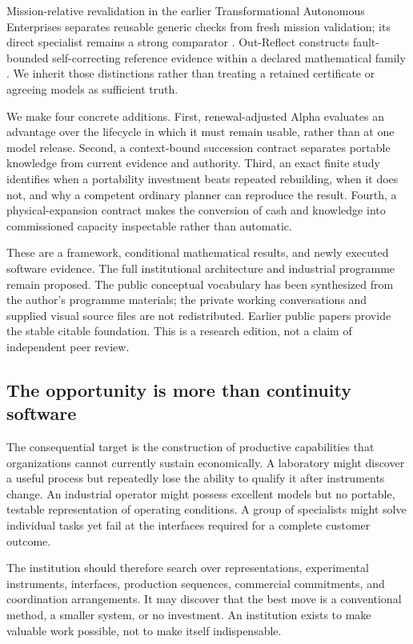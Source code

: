 Mission-relative revalidation in the earlier Transformational Autonomous Enterprises separates reusable generic checks from fresh mission validation; its direct specialist remains a strong comparator \citep{boucherEnterprise}. Out-Reflect constructs fault-bounded self-correcting reference evidence within a declared mathematical family \citep{boucherReflect}. We inherit those distinctions rather than treating a retained certificate or agreeing models as sufficient truth.

We make four concrete additions. First, renewal-adjusted Alpha evaluates an advantage over the lifecycle in which it must remain usable, rather than at one model release. Second, a context-bound succession contract separates portable knowledge from current evidence and authority. Third, an exact finite study identifies when a portability investment beats repeated rebuilding, when it does not, and why a competent ordinary planner can reproduce the result. Fourth, a physical-expansion contract makes the conversion of cash and knowledge into commissioned capacity inspectable rather than automatic.

These are a framework, conditional mathematical results, and newly executed software evidence. The full institutional architecture and industrial programme remain proposed. The public conceptual vocabulary has been synthesized from the author's programme materials; the private working conversations and supplied visual source files are not redistributed. Earlier public papers provide the stable citable foundation. This is a research edition, not a claim of independent peer review.

\subsection{The opportunity is more than continuity software}
The consequential target is the construction of productive capabilities that organizations cannot currently sustain economically. A laboratory might discover a useful process but repeatedly lose the ability to qualify it after instruments change. An industrial operator might possess excellent models but no portable, testable representation of operating conditions. A group of specialists might solve individual tasks yet fail at the interfaces required for a complete customer outcome.

The institution should therefore search over representations, experimental instruments, interfaces, production sequences, commercial commitments, and coordination arrangements. It may discover that the best move is a conventional method, a smaller system, or no investment. An institution exists to make valuable work possible, not to make itself indispensable.

